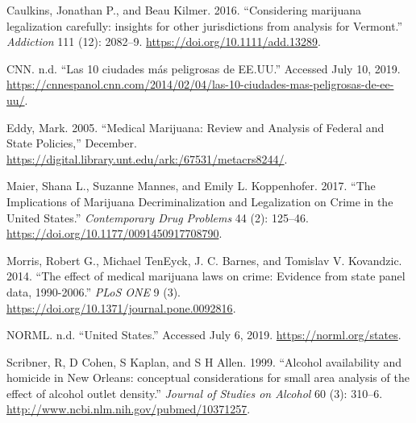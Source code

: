 \documentclass[11pt,]{article}
\begin{document}
\setlength{\parindent}{-0.2in}
\setlength{\leftskip}{0.2in}
\setlength{\parskip}{8pt}
\vspace*{-0.2in}

\noindent

\hypertarget{refs}{}
\leavevmode\hypertarget{ref-Caulkins2016}{}%
Caulkins, Jonathan P., and Beau Kilmer. 2016. ``Considering marijuana
legalization carefully: insights for other jurisdictions from analysis
for Vermont.'' \emph{Addiction} 111 (12): 2082--9.
\url{https://doi.org/10.1111/add.13289}.

\leavevmode\hypertarget{ref-CNN}{}%
CNN. n.d. ``Las 10 ciudades más peligrosas de EE.UU.'' Accessed July 10,
2019.
\url{https://cnnespanol.cnn.com/2014/02/04/las-10-ciudades-mas-peligrosas-de-ee-uu/}.

\leavevmode\hypertarget{ref-Eddy2005}{}%
Eddy, Mark. 2005. ``Medical Marijuana: Review and Analysis of Federal
and State Policies,'' December.
\url{https://digital.library.unt.edu/ark:/67531/metacrs8244/}.

\leavevmode\hypertarget{ref-Maier2017}{}%
Maier, Shana L., Suzanne Mannes, and Emily L. Koppenhofer. 2017. ``The
Implications of Marijuana Decriminalization and Legalization on Crime in
the United States.'' \emph{Contemporary Drug Problems} 44 (2): 125--46.
\url{https://doi.org/10.1177/0091450917708790}.

\leavevmode\hypertarget{ref-Morris2014}{}%
Morris, Robert G., Michael TenEyck, J. C. Barnes, and Tomislav V.
Kovandzic. 2014. ``The effect of medical marijuana laws on crime:
Evidence from state panel data, 1990-2006.'' \emph{PLoS ONE} 9 (3).
\url{https://doi.org/10.1371/journal.pone.0092816}.

\leavevmode\hypertarget{ref-NORML}{}%
NORML. n.d. ``United States.'' Accessed July 6, 2019.
\url{https://norml.org/states}.

\leavevmode\hypertarget{ref-Scribner1999}{}%
Scribner, R, D Cohen, S Kaplan, and S H Allen. 1999. ``Alcohol
availability and homicide in New Orleans: conceptual considerations for
small area analysis of the effect of alcohol outlet density.''
\emph{Journal of Studies on Alcohol} 60 (3): 310--6.
\url{http://www.ncbi.nlm.nih.gov/pubmed/10371257}.




\newpage
\singlespacing 
\end{document}
